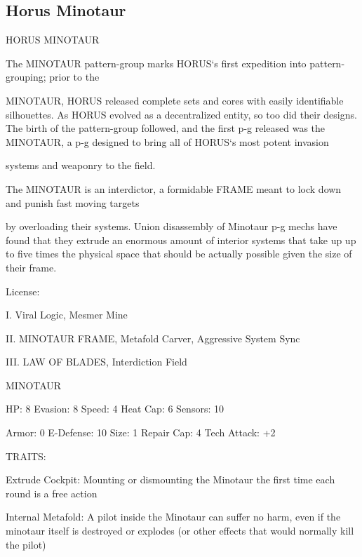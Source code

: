 \subsection{Horus Minotaur}


                                          HORUS MINOTAUR  

The MINOTAUR pattern-group marks HORUS‘s first expedition into pattern-grouping; prior to the  

MINOTAUR, HORUS released complete sets and cores with easily identifiable silhouettes. As HORUS  
evolved as a decentralized entity, so too did their designs. The birth of the pattern-group followed, and the  
first p-g released was the MINOTAUR, a p-g designed to bring all of HORUS‘s most potent invasion  

systems and weaponry to the field.   

The MINOTAUR is an interdictor, a formidable FRAME meant to lock down and punish fast moving targets  

by overloading their systems. Union disassembly of Minotaur p-g mechs have found that they extrude an  
enormous amount of interior systems that take up up to five times the physical space that should be  
actually possible given the size of their frame.  

                                                    License:
 
I. Viral Logic, Mesmer Mine
 
II. MINOTAUR FRAME, Metafold Carver, Aggressive System Sync
 
III. LAW OF BLADES, Interdiction Field
 

                                                 MINOTAUR 

 HP: 8           Evasion: 8                            Speed: 4            Heat Cap: 6        Sensors: 10 

 Armor: 0        E-Defense: 10                         Size: 1             Repair Cap: 4      Tech Attack:  
                                                                                              +2 

                                                    TRAITS: 

 Extrude Cockpit: Mounting or dismounting the Minotaur the first time each round is a free action
 
 Internal Metafold: A pilot inside the Minotaur can suffer no harm, even if the minotaur itself is  
 destroyed or explodes (or other effects that would normally kill the pilot)
 
